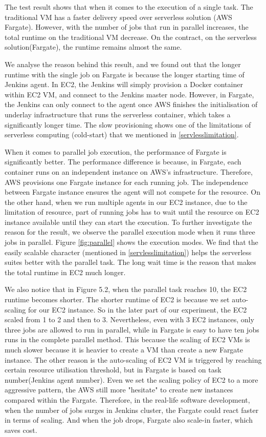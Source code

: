 \par
The test result shows that when it comes to the execution of a single task. The traditional VM has a faster delivery speed over serverless solution (AWS Fargate). However, with the number of jobs that run in parallel increases, the total runtime on the traditional VM decrease. On the contract, on the serverless solution(Fargate), the runtime remains almost the same.
\par
We analyse the reason behind this result, and we found out that the longer runtime with the single job on Fargate is because the longer starting time of Jenkins agent. In EC2, the Jenkins will simply provision a Docker container within EC2 VM, and connect to the Jenkins master node. However, in Fargate, the Jenkins can only connect to the agent once AWS finishes the initialisation of underlay infrastructure that runs the serverless container, which takes a significantly longer time. The slow provisioning shows one of the limitations of serverless computing (cold-start) that we mentioned in \ref{servlesslimitation}.
\par
When it comes to parallel job execution, the performance of Fargate is significantly better. The performance difference is because, in Fargate, each container runs on an independent instance on AWS's infrastructure. Therefore, AWS provisions one Fargate instance for each running job. The independence between Fargate instance ensures the agent will not compete for the resource. On the other hand, when we run multiple agents in our EC2 instance, due to the limitation of resource, part of running jobs has to wait until the resource on EC2 instance available until they can start the execution. To further investigate the reason for the result, we observe the parallel execution mode when it runs three jobs in parallel. Figure \ref{fig:parallel} shows the execution modes. We find that the easily scalable character (mentioned in \ref{servlesslimitation}) helps the serverless suites better with the parallel task. The long wait time is the reason that makes the total runtime in EC2 much longer.
\par
We also notice that in Figure 5.2, when the parallel task reaches 10, the EC2 runtime becomes shorter. The shorter runtime of EC2 is because we set auto-scaling for our EC2 instance. So in the later part of our experiment, the EC2 scaled from 1 to 2 and then to 3. Nevertheless, even with 3 EC2 instances, only three jobs are allowed to run in parallel, while in Fargate is easy to have ten jobs runs in the complete parallel method. This because the scaling of EC2 VMs is much slower because it is heavier to create a VM than create a new Fargate instance. The other reason is the auto-scaling of EC2 VM is triggered by reaching certain resource utilisation threshold, but in Fargate is based on task number(Jenkins agent number). Even we set the scaling policy of EC2 to a more aggressive pattern, the AWS still more "hesitate" to create new instances compared within the Fargate. 
Therefore, in the real-life software development, when the number of jobs surges in Jenkins cluster, the Fargate could react faster in terms of scaling. And when the job drops, Fargate also scale-in faster, which saves cost.
